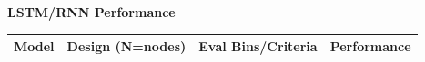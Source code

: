 \documentclass[final]{beamer}
\newlength{\colwidth}
\begin{document}
\begin{frame}[t]
\begin{columns}[t]
\begin{column}{\colwidth}
\begin{block}
\begin{figure}
        \end{figure}

        \large{\textbf{LSTM/RNN Performance}}\vspace*{-\baselineskip}
        \large{
          \begin{table}
            \centering
            \begin{tabular}{l l l l}
              \toprule
              \multicolumn{1}{|l|}{\textbf{Model}}                                                                                                         & \multicolumn{1}{|l|}{\textbf{Design (N=nodes)}} & \multicolumn{1}{|l|}{\textbf{Eval Bins/Criteria}} & \multicolumn{1}{|l|}{\textbf{Performance}} \\
              \midrule


\end{tabular}
\end{table}}
\end{block}
\end{column}
\end{columns}
\end{frame}
\end{document}
